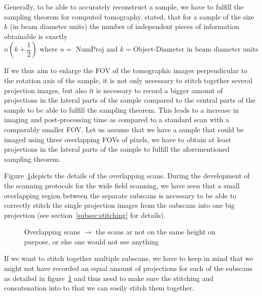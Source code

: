 Generally, to be able to accurately reconstruct a sample, we have to fulfill the sampling theorem for computed tomography. \citet{Cormack1978} stated, that for a sample of the size $k$ (in beam diameter units) the number of independent pieces of information obtainable is exactly
\begin{equation}
n(k+\frac{1}{2}) \text{ where }n=\text{ NumProj and }k=\text{Object-Diameter in beam diameter units}
\end{equation}

If we thus aim to enlarge the FOV of the tomographic images perpendicular to the rotation axis of the sample, it is not only necessary to stitch together several projection images, but also it is necessary to record a bigger amount of projections in the lateral parts of the sample compared to the central parts of the sample to be able to fulfill the sampling theorem. This leads to a increase in imaging and post-processing time as compared to a standard scan with a comparably smaller FOV. Let us assume that we have a sample that could be imaged using three overlapping FOVs of \unit{}{pixels}, we have to obtain at least \unit{}{projections} in the lateral parts of the sample to fulfill the aforementioned sampling theorem.

Figure~\ref{fig:overlapping scans}depicts the details of the overlapping scans. During the development of the scanning protocols for the wide field scanning, we have seen that a small overlapping region between the separate subscans is necessary to be able to correctly stitch the single projection images from the subscans into one big projection (see section~\ref{subsec:stitching} for details).

\begin{figure}[tb]
	\centering
	
	\caption{Overlapping scans $\rightarrow$ the scans ar not on the same height on purpose, or else one would not see anything}
	\label{fig:overlapping scans}
\end{figure}	

If we want to stitch together multiple subscans, we have to keep in mind that we might not have recorded an equal amount of projections for each of the subscans as detailed in figure~\ref{fig:overlapping scans} and thus need to make sure the stitching and concatenation into to that we can easily stitch them together.

